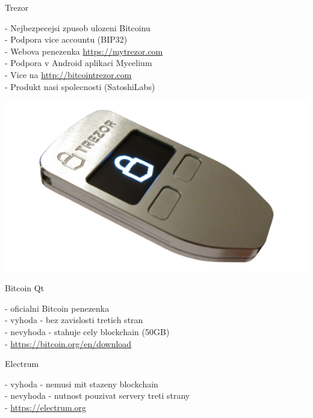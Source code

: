 \documentclass{beamer}
\begin{document}
\begin{frame}

    {\LARGE Trezor}\\

    \vspace{5mm}

    - Nejbezpecejsi zpusob ulozeni Bitcoinu\\
    - Podpora vice accountu (BIP32)\\
    - Webova penezenka \url{https://mytrezor.com}\\
    - Podpora v Android aplikaci Mycelium\\
    - Vice na \url{http://bitcointrezor.com}\\
    - Produkt nasi spolecnosti (SatoshiLabs)\\

    \vspace{5mm}

    \includegraphics[scale=0.3]{img/trezor}

\end{frame}

\begin{frame}

    {\LARGE Bitcoin Qt}\\

    \vspace{5mm}

    - oficialni Bitcoin penezenka\\
    - vyhoda - bez zavislosti tretich stran\\
    - nevyhoda - stahuje cely blockchain (50GB)\\
    - \url{https://bitcoin.org/en/download}

    \vspace{10mm}

    {\LARGE Electrum}\\

    \vspace{5mm}

    - vyhoda - nemusi mit stazeny blockchain\\
    - nevyhoda - nutnost pouzivat servery treti strany\\
    - \url{https://electrum.org}

\end{frame}
\end{document}
